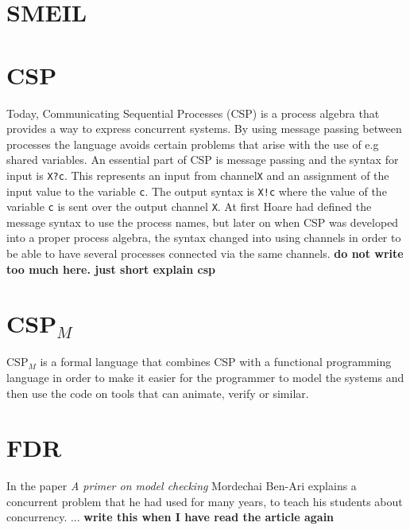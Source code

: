 \documentclass[a4paper]{report}
\newcommand{\cspm}{CSP$_M$ }
\begin{document}
\section{SMEIL}
\section{CSP}
Today, Communicating Sequential Processes (CSP) is a process algebra that provides a way to express concurrent systems. By using message passing between processes the language avoids certain problems that arise with the use of e.g shared variables. An essential part of CSP is message passing and the syntax for input is \texttt{X?c}. This represents an input from channel\texttt{X} and an assignment of the input value to the variable \texttt{c}. The output syntax is \texttt{X!c} where the value of the variable \texttt{c} is sent over the output channel \texttt{X}. At first Hoare had defined the message syntax to use the process names, but later on when CSP was developed into a proper process algebra, the syntax changed into using channels in order to be able to have several processes connected via the same channels.   \textbf{do not write too much here. just short explain csp}
\section{\cspm{}}
\cspm is a formal language that combines CSP with a functional programming language in order to make it easier for the programmer to model the systems and then use the code on tools that can animate, verify or similar.
\section{FDR}
In the paper \textit{A primer on model checking}\cite{Ben-ari2010} Mordechai Ben-Ari explains a concurrent problem that he had used for many years, to teach his students about concurrency. ... \textbf{write this when I have read the article again}
\end{document}
